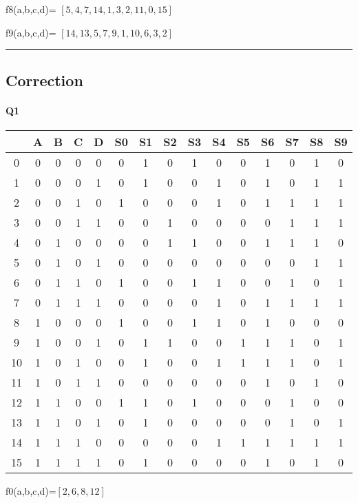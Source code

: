 f8(a,b,c,d)= $[5, 4, 7, 14, 1, 3, 2, 11, 0, 15]$

f9(a,b,c,d)= $[14, 13, 5, 7, 9, 1, 10, 6, 3, 2]$


\hrule width 1\linewidth\pagebreak
\subsection{Correction}

\paragraph{Q1}

        \begin{tabular}{|c|c|c|c|c||c|c|c|c|c|c|c|c|c|c|}
    \toprule
         & A & B & C & D & S0 & S1 & S2 & S3 & S4 & S5 & S6 & S7 & S8 & S9\\ \midrule0 & 0 & 0 & 0 & 0 & 0 & 1 & 0 & 1 & 0 & 0 & 1 & 0 & 1 & 0\\1 & 0 & 0 & 0 & 1 & 0 & 1 & 0 & 0 & 1 & 0 & 1 & 0 & 1 & 1\\2 & 0 & 0 & 1 & 0 & 1 & 0 & 0 & 0 & 1 & 0 & 1 & 1 & 1 & 1\\3 & 0 & 0 & 1 & 1 & 0 & 0 & 1 & 0 & 0 & 0 & 0 & 1 & 1 & 1\\\midrule4 & 0 & 1 & 0 & 0 & 0 & 0 & 1 & 1 & 0 & 0 & 1 & 1 & 1 & 0\\5 & 0 & 1 & 0 & 1 & 0 & 0 & 0 & 0 & 0 & 0 & 0 & 0 & 1 & 1\\6 & 0 & 1 & 1 & 0 & 1 & 0 & 0 & 1 & 1 & 0 & 0 & 1 & 0 & 1\\7 & 0 & 1 & 1 & 1 & 0 & 0 & 0 & 0 & 1 & 0 & 1 & 1 & 1 & 1\\\midrule8 & 1 & 0 & 0 & 0 & 1 & 0 & 0 & 1 & 1 & 0 & 1 & 0 & 0 & 0\\9 & 1 & 0 & 0 & 1 & 0 & 1 & 1 & 0 & 0 & 1 & 1 & 1 & 0 & 1\\10 & 1 & 0 & 1 & 0 & 0 & 1 & 0 & 0 & 1 & 1 & 1 & 1 & 0 & 1\\11 & 1 & 0 & 1 & 1 & 0 & 0 & 0 & 0 & 0 & 0 & 1 & 0 & 1 & 0\\\midrule12 & 1 & 1 & 0 & 0 & 1 & 1 & 0 & 1 & 0 & 0 & 0 & 1 & 0 & 0\\13 & 1 & 1 & 0 & 1 & 0 & 1 & 0 & 0 & 0 & 0 & 0 & 1 & 0 & 1\\14 & 1 & 1 & 1 & 0 & 0 & 0 & 0 & 0 & 1 & 1 & 1 & 1 & 1 & 1\\15 & 1 & 1 & 1 & 1 & 0 & 1 & 0 & 0 & 0 & 0 & 1 & 0 & 1 & 0\\\bottomrule
        \end{tabular}
        f0(a,b,c,d)=$[2, 6, 8, 12]$

